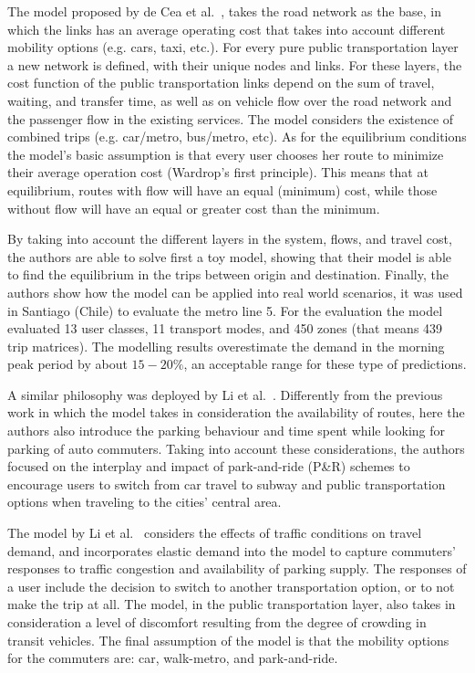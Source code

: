 The model proposed by de Cea et al.~\cite{decea2005equilibrium}, takes the road network as the base, in which the links has an average operating cost that takes into account different mobility options (e.g. cars, taxi, etc.). For every pure public transportation layer a new network is defined, with their unique nodes and links. For these layers, the cost function of the public transportation links depend on the sum of travel, waiting, and transfer time, as well as on vehicle flow over the road network and the passenger flow in the existing services. The model considers the existence of combined trips (e.g. car/metro, bus/metro, etc). As for the equilibrium conditions the model's basic assumption is that every user chooses her route to minimize their average operation cost (Wardrop’s first principle). This means that at equilibrium, routes with flow will have an equal (minimum) cost, while those without flow will have an equal or greater cost than the minimum.

By taking into account the different layers in the system, flows, and travel cost, the authors are able to solve first a toy model, showing that their model is able to find the equilibrium in the trips between origin and destination. Finally, the authors show how the model can be applied into real world scenarios, it was used in Santiago (Chile) to evaluate the metro line 5. For the evaluation the model evaluated 13 user classes, 11 transport modes, and 450 zones (that means 439 trip matrices). The modelling results overestimate the demand in the morning peak period by about $15-20\%$, an acceptable range for these type of predictions.

A similar philosophy was deployed by Li et al.~\cite{li2007parkride}. Differently from the previous work in which the model takes in consideration the availability of routes, here the authors also introduce the parking behaviour and time spent while looking for parking of auto commuters. Taking into account these considerations, the authors focused on the interplay and impact of park-and-ride (P\&R) schemes to encourage users to switch from car travel to subway and public transportation options when traveling to the cities' central area. 

The model by Li et al.~\cite{li2007parkride} considers the effects of traffic conditions on travel demand, and incorporates elastic demand into the model to capture commuters’ responses to traffic congestion and availability of parking supply. The responses of a user include the decision to switch to another transportation option, or to not make the trip at all. The model, in the public transportation layer, also takes in consideration a level of discomfort resulting from the degree of crowding in transit vehicles. The final assumption of the model is that the mobility options for the commuters are: car, walk-metro, and park-and-ride.

